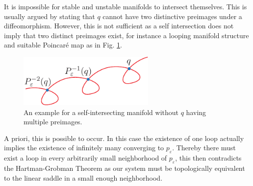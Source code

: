 \begin{remark}[]
	It is impossible for stable and unstable manifolds to intersect themselves. This is usually argued by stating that $q$ cannot have two distinctive preimages under a diffeomorphism. However, this is not sufficient as a self intersection does not imply that two distinct preimages exist, for instance a looping manifold structure and suitable Poincaré map as in Fig. \ref{fig:loopdeloop}.
	\begin{figure}[h!]
		\centering
		\includegraphics[width=0.6\textwidth]{figures/ch6/12loopdeloop.pdf}
		\caption{An example for a self-intersecting manifold without $q$ having multiple preimages.}
		\label{fig:loopdeloop}
	\end{figure}
A priori, this is possible to occur. In this case the existence of one loop actually implies the existence of infinitely many converging to $p_{\varepsilon}$. Thereby there must exist a loop in every arbitrarily small neighborhood of $p_{\varepsilon}$, this then contradicts the Hartman-Grobman Theorem as our system must be topologically equivalent to the linear saddle in a small enough neighborhood. 	
\end{remark}

